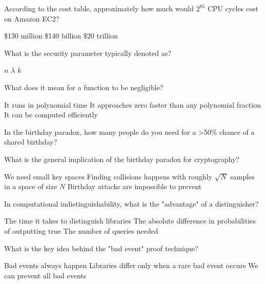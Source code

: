\documentclass[10pt,a4paper,american]{exam}
\begin{document}
\begin{questions}
	\question According to the cost table, approximately how much would $2^{85}$ CPU cycles cost on Amazon EC2?
	\begin{randomizechoices}
		\choice \$130 million
		\CorrectChoice \$140 billion
		\choice \$20 trillion
	\end{randomizechoices}

	\question What is the security parameter typically denoted as?
	\begin{randomizechoices}
		\choice $n$
		\CorrectChoice $\lambda$
		\choice $k$
	\end{randomizechoices}

	\question What does it mean for a function to be negligible?
	\begin{randomizechoices}
		\choice It runs in polynomial time
		\CorrectChoice It approaches zero faster than any polynomial fraction
		\choice It can be computed efficiently
	\end{randomizechoices}

	\question In the birthday paradox, how many people do you need for a >50\% chance of a shared birthday?
	\begin{randomizechoices}
		\choice 50
		\choice 183
		\CorrectChoice 23
	\end{randomizechoices}

	\question What is the general implication of the birthday paradox for cryptography?
	\begin{randomizechoices}
		\choice We need small key spaces
		\CorrectChoice Finding collisions happens with roughly $\sqrt{N}$ samples in a space of size $N$
		\choice Birthday attacks are impossible to prevent
	\end{randomizechoices}

	\question In computational indistinguishability, what is the "advantage" of a distinguisher?
	\begin{randomizechoices}
		\choice The time it takes to distinguish libraries
		\CorrectChoice The absolute difference in probabilities of outputting true
		\choice The number of queries needed
	\end{randomizechoices}

	\question What is the key idea behind the "bad event" proof technique?
	\begin{randomizechoices}
		\choice Bad events always happen
		\CorrectChoice Libraries differ only when a rare bad event occurs
		\choice We can prevent all bad events
	\end{randomizechoices}


\end{questions}
\end{document}
